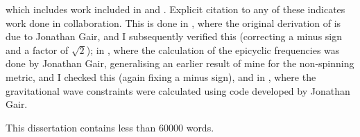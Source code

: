 which includes work included in  and . Explicit citation to any of these indicates work done in collaboration. This is done in , where the original derivation of  is due to Jonathan Gair, and I subsequently verified this (correcting a minus sign and a factor of $\sqrt{2}$); in , where the calculation of the epicyclic frequencies was done by Jonathan Gair, generalising an earlier result of mine for the non-spinning metric, and I checked this (again fixing a minus sign), and in , where the gravitational wave constraints were calculated using code developed by Jonathan Gair.

This dissertation contains less than $60000$ words.
